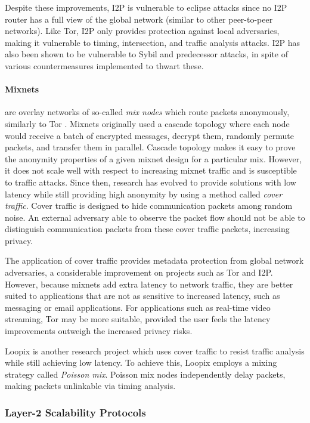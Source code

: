 Despite these improvements, I2P is vulnerable to eclipse attacks since no I2P router has a full view of the global network (similar to other peer-to-peer networks). Like Tor, I2P only provides protection against local adversaries, making it vulnerable to timing, intersection, and traffic analysis attacks. I2P has also been shown to be vulnerable to Sybil and predecessor attacks, in spite of various countermeasures implemented to thwart these.

\paragraph{Mixnets} are overlay networks of so-called \textit{mix nodes} which route packets anonymously, similarly to Tor \cite{mixnets}. Mixnets originally used a cascade topology where each node would receive a batch of encrypted messages, decrypt them, randomly permute packets, and transfer them in parallel. Cascade topology makes it easy to prove the anonymity properties of a given mixnet design for a particular mix. However, it does not scale well with respect to increasing mixnet traffic and is susceptible to traffic attacks. Since then, research has evolved to provide solutions with low latency while still providing high anonymity by using a method called \textit{cover traffic}. Cover traffic is designed to hide communication packets among random noise. An external adversary able to observe the packet flow should not be able to distinguish communication packets from these cover traffic packets, increasing privacy.

The application of cover traffic provides metadata protection from global network adversaries, a considerable improvement on projects such as Tor and I2P. However, because mixnets add extra latency to network traffic, they are better suited to applications that are not as sensitive to increased latency, such as messaging or email applications. For applications such as real-time video streaming, Tor may be more suitable, provided the user feels the latency improvements outweigh the increased privacy risks.

Loopix \cite{loopix} is another research project which uses cover traffic to resist traffic analysis while still achieving low latency. To achieve this, Loopix employs a mixing strategy called \textit{Poisson mix}. Poisson mix nodes independently delay packets, making packets unlinkable via timing analysis.

\subsubsection{Layer-2 Scalability Protocols}
\label{sec:l2protocols}

